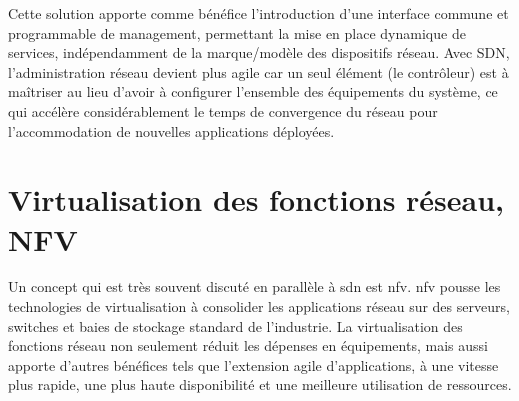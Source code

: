 
Cette solution apporte comme bénéfice l'introduction d'une interface commune et programmable de management, permettant la mise en place dynamique de services, indépendamment de la marque/modèle des dispositifs réseau. Avec SDN, l'administration réseau devient plus agile car un seul élément (le contrôleur) est à maîtriser au lieu d'avoir à configurer l'ensemble des équipements du système, ce qui accélère considérablement le temps de convergence du réseau pour l'accommodation de nouvelles applications déployées. \cite{SDNNewNormONFExecutiveSummary} \cite{ImplementationChallengesForSDNBackground}





\section{Virtualisation des fonctions réseau, NFV}


Un concept qui est très souvent discuté en parallèle à \gls{sdn} est \gls{nfv}. \gls{nfv} pousse les technologies de virtualisation à consolider les applications réseau sur des serveurs, switches et baies de stockage standard de l'industrie. La virtualisation des fonctions réseau non seulement réduit les dépenses en équipements, mais aussi apporte d'autres bénéfices tels que l'extension agile d'applications, à une vitesse plus rapide, une plus haute disponibilité et une meilleure utilisation de ressources.

